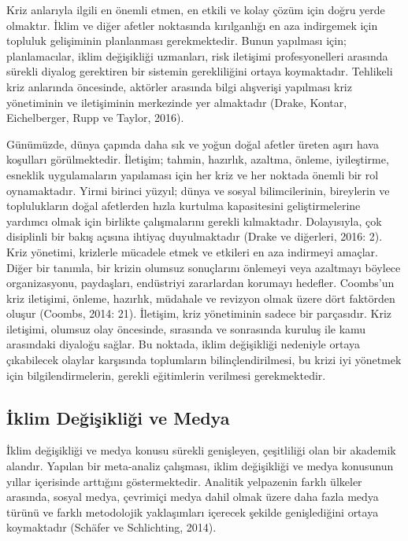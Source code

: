\documentclass[
]{book}
\begin{document}
Kriz anlarıyla ilgili en önemli etmen, en etkili ve kolay çözüm için doğru yerde olmaktır. İklim ve diğer afetler noktasında kırılganlığı en aza indirgemek için topluluk gelişiminin planlanması gerekmektedir. Bunun yapılması için; planlamacılar, iklim değişikliği uzmanları, risk iletişimi profesyonelleri arasında sürekli diyalog gerektiren bir sistemin gerekliliğini ortaya koymaktadır. Tehlikeli kriz anlarında öncesinde, aktörler arasında bilgi alışverişi yapılması kriz yönetiminin ve iletişiminin merkezinde yer almaktadır (Drake, Kontar, Eichelberger, Rupp ve Taylor, 2016).

Günümüzde, dünya çapında daha sık ve yoğun doğal afetler üreten aşırı hava koşulları görülmektedir. İletişim; tahmin, hazırlık, azaltma, önleme, iyileştirme, esneklik uygulamaların yapılaması için her kriz ve her noktada önemli bir rol oynamaktadır. Yirmi birinci yüzyıl; dünya ve sosyal bilimcilerinin, bireylerin ve toplulukların doğal afetlerden hızla kurtulma kapasitesini geliştirmelerine yardımcı olmak için birlikte çalışmalarını gerekli kılmaktadır. Dolayısıyla, çok disiplinli bir bakış açısına ihtiyaç duyulmaktadır (Drake ve diğerleri, 2016: 2). Kriz yönetimi, krizlerle mücadele etmek ve etkileri en aza indirmeyi amaçlar. Diğer bir tanımla, bir krizin olumsuz sonuçlarını önlemeyi veya azaltmayı böylece organizasyonu, paydaşları, endüstriyi zararlardan korumayı hedefler. Coombs'un kriz iletişimi, önleme, hazırlık, müdahale ve revizyon olmak üzere dört faktörden oluşur (Coombs, 2014: 21). İletişim, kriz yönetiminin sadece bir parçasıdır. Kriz iletişimi, olumsuz olay öncesinde, sırasında ve sonrasında kuruluş ile kamu arasındaki diyaloğu sağlar. Bu noktada, iklim değişikliği nedeniyle ortaya çıkabilecek olaylar karşısında toplumların bilinçlendirilmesi, bu krizi iyi yönetmek için bilgilendirmelerin, gerekli eğitimlerin verilmesi gerekmektedir.

\hypertarget{iklim-deux11fiux15fikliux11fi-ve-medya}{%
\subsection{İklim Değişikliği ve Medya}\label{iklim-deux11fiux15fikliux11fi-ve-medya}}

İklim değişikliği ve medya konusu sürekli genişleyen, çeşitliliği olan bir akademik alandır. Yapılan bir meta-analiz çalışması, iklim değişikliği ve medya konusunun yıllar içerisinde arttığını göstermektedir. Analitik yelpazenin farklı ülkeler arasında, sosyal medya, çevrimiçi medya dahil olmak üzere daha fazla medya türünü ve farklı metodolojik yaklaşımları içerecek şekilde genişlediğini ortaya koymaktadır (Schäfer ve Schlichting, 2014).
\end{document}
